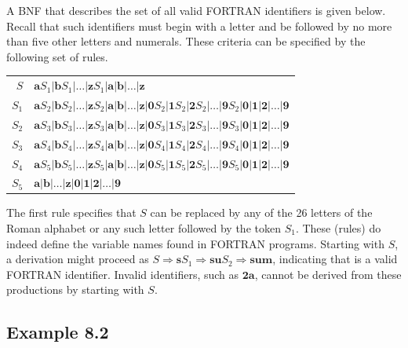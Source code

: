 A BNF that describes the set of all valid FORTRAN identifiers is given below.
Recall that such identifiers must begin with a letter and be followed by no
more than five other letters and numerals. These criteria can be specified by
the following set of rules.
\begin{center}\begin{tabular}{r@{:: = }l}
$S$ & $\pmb{a}S_1|\pmb{b}S_1| \ldots |\pmb{z}S_1|\pmb{a}|\pmb{b}| \ldots
	|\pmb{z}$ \\
$S_1$ & $\pmb{a}S_2|\pmb{b}S_2| \ldots |\pmb{z}S_2|\pmb{a}|\pmb{b}| \ldots
	|\pmb{z}|\pmb{0}S_2|\pmb{1}S_2|\pmb{2}S_2| \ldots |\pmb{9}S_2|\pmb{0}|
	\pmb{1}|\pmb{2}| \ldots |\pmb{9}$ \\
$S_2$ & $\pmb{a}S_3|\pmb{b}S_3| \ldots |\pmb{z}S_3|\pmb{a}|\pmb{b}| \ldots
	|\pmb{z}|\pmb{0}S_3|\pmb{1}S_3|\pmb{2}S_3| \ldots |\pmb{9}S_3|\pmb{0}|
	\pmb{1}|\pmb{2}| \ldots |\pmb{9}$ \\
$S_3$ & $\pmb{a}S_4|\pmb{b}S_4| \ldots |\pmb{z}S_4|\pmb{a}|\pmb{b}| \ldots
	|\pmb{z}|\pmb{0}S_4|\pmb{1}S_4|\pmb{2}S_4| \ldots |\pmb{9}S_4|\pmb{0}|
	\pmb{1}|\pmb{2}| \ldots |\pmb{9}$ \\
$S_4$ & $\pmb{a}S_5|\pmb{b}S_5| \ldots |\pmb{z}S_5|\pmb{a}|\pmb{b}| \ldots
	|\pmb{z}|\pmb{0}S_5|\pmb{1}S_5|\pmb{2}S_5| \ldots |\pmb{9}S_5|\pmb{0}|
	\pmb{1}|\pmb{2}| \ldots |\pmb{9}$ \\
$S_5$ & $\pmb{a}|\pmb{b}| \ldots |\pmb{z}|\pmb{0}|\pmb{1}|\pmb{2}| \ldots 
	|\pmb{9}$
\end{tabular}\end{center}
The first rule specifies that $S$ can be replaced by any of the 26 letters of
the Roman alphabet or any such letter followed by the token $S_1$. These
\emph{} (rules) do indeed define the variable names found in
FORTRAN programs. Starting with $S$, a derivation might proceed as $S \Rightarrow
\pmb{s}S_1 \Rightarrow \pmb{su}S_2 \Rightarrow \pmb{sum}$, indicating that 
is a valid FORTRAN identifier. Invalid identifiers, such as $\pmb{2a}$, cannot
be derived from these productions by starting with $S$.

\subsection*{Example 8.2}

